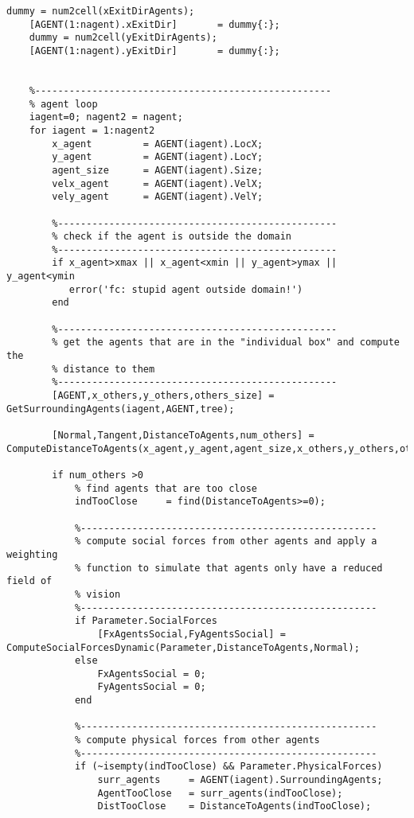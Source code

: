 \begin{lstlisting}[breaklines]
    dummy = num2cell(xExitDirAgents);
    [AGENT(1:nagent).xExitDir]       = dummy{:};
    dummy = num2cell(yExitDirAgents);
    [AGENT(1:nagent).yExitDir]       = dummy{:};


    %----------------------------------------------------
    % agent loop
    iagent=0; nagent2 = nagent;
    for iagent = 1:nagent2
        x_agent         = AGENT(iagent).LocX;
        y_agent         = AGENT(iagent).LocY;
        agent_size      = AGENT(iagent).Size;
        velx_agent      = AGENT(iagent).VelX;
        vely_agent      = AGENT(iagent).VelY;

        %-------------------------------------------------
        % check if the agent is outside the domain
        %-------------------------------------------------
        if x_agent>xmax || x_agent<xmin || y_agent>ymax || y_agent<ymin
           error('fc: stupid agent outside domain!')
        end

        %-------------------------------------------------
        % get the agents that are in the "individual box" and compute the
        % distance to them
        %-------------------------------------------------
        [AGENT,x_others,y_others,others_size] = GetSurroundingAgents(iagent,AGENT,tree);

        [Normal,Tangent,DistanceToAgents,num_others] = ComputeDistanceToAgents(x_agent,y_agent,agent_size,x_others,y_others,others_size);

        if num_others >0
            % find agents that are too close
            indTooClose     = find(DistanceToAgents>=0);

            %----------------------------------------------------
            % compute social forces from other agents and apply a weighting
            % function to simulate that agents only have a reduced field of
            % vision
            %----------------------------------------------------
            if Parameter.SocialForces
                [FxAgentsSocial,FyAgentsSocial] = ComputeSocialForcesDynamic(Parameter,DistanceToAgents,Normal);
            else
                FxAgentsSocial = 0;
                FyAgentsSocial = 0;
            end

            %----------------------------------------------------
            % compute physical forces from other agents
            %----------------------------------------------------
            if (~isempty(indTooClose) && Parameter.PhysicalForces)
                surr_agents     = AGENT(iagent).SurroundingAgents;
                AgentTooClose   = surr_agents(indTooClose);
                DistTooClose    = DistanceToAgents(indTooClose);


\end{lstlisting}
